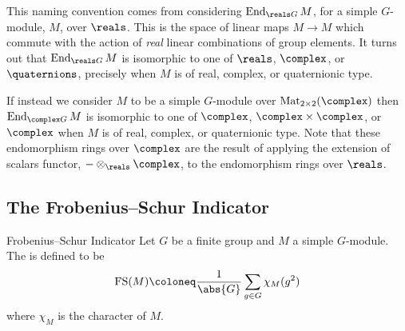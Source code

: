 This naming convention comes from considering \(\End_{\reals G}M\), for a simple \(G\)-module, \(M\), over \(\reals\).
This is the space of linear maps \(M \to M\) which commute with the action of \emph{real} linear combinations of group elements.
It turns out that \(\End_{\reals G}M\) is isomorphic to one of \(\reals\), \(\complex\), or \(\quaternions\), precisely when \(M\) is of real, complex, or quaternionic type.

If instead we consider \(M\) to be a simple \(G\)-module over \(\Mat_{2 \times 2}(\complex)\) then \(\End_{\complex G}M\) is isomorphic to one of \(\complex\), \(\complex \times \complex\), or \(\complex\) when \(M\) is of real, complex, or quaternionic type.
Note that these endomorphism rings over \(\complex\) are the result of applying the extension of scalars functor, \({-} \otimes_{\reals} \complex\), to the endomorphism rings over \(\reals\).

\subsection{The Frobenius--Schur Indicator}
\begin{dfn}{Frobenius--Schur Indicator}{}
    Let \(G\) be a finite group and \(M\) a simple \(G\)-module.
    The  is defined to be
    \begin{equation}
        \frobeniusSchur(M) \coloneq \frac{1}{\abs{G}} \sum_{g \in G} \chi_M(g^2)
    \end{equation}
    where \(\chi_M\) is the character of \(M\).
\end{dfn}

